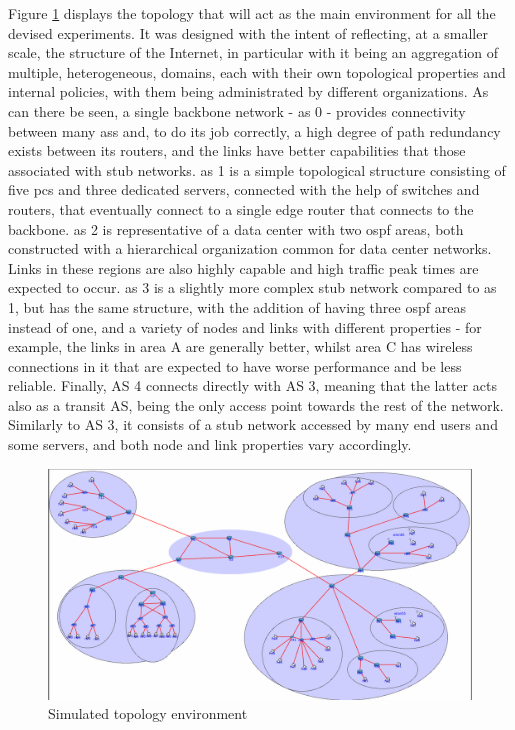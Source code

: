     Figure \ref{fig:test-topology} displays the topology that will act as the main environment for all the devised experiments.
    It was designed with the intent of reflecting, at a smaller scale, the structure of the Internet, in particular with it being an aggregation of multiple, heterogeneous, domains, each with their own topological properties and internal policies, with them being administrated by different organizations.
    As can there be seen, a single backbone network - \gls{as} 0 - provides connectivity between many \glspl{as} and, to do its job correctly, a high degree of path redundancy exists between its routers, and the links have better capabilities that those associated with stub networks.
    \gls{as} 1 is a simple topological structure consisting of five \glspl{pc} and three dedicated servers, connected with the help of switches and routers, that eventually connect to a single edge router that connects to the backbone.
    \gls{as} 2 is representative of a data center with two \gls{ospf} areas, both constructed with a hierarchical organization common for data center networks.
    Links in these regions are also highly capable and high traffic peak times are expected to occur.
    \gls{as} 3 is a slightly more complex stub network compared to \gls{as} 1, but has the same structure, with the addition of having three \gls{ospf} areas instead of one, and a variety of nodes and links with different properties - for example, the links in area A are generally better, whilst area C has wireless connections in it that are expected to have worse performance and be less reliable.
    Finally, AS 4 connects directly with AS 3, meaning that the latter acts also as a transit AS, being the only access point towards the rest of the network.
    Similarly to AS 3, it consists of a stub network accessed by many end users and some servers, and both node and link properties vary accordingly.


    \begin{figure}[ht]
    \centering
    \includegraphics[scale=0.5]{img/test-topology.png}
    \caption{Simulated topology environment}
    \label{fig:test-topology}
    \end{figure}

